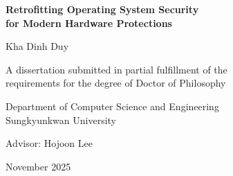 \documentclass[a4paper,11pt]{report}
\begin{document}



\begin{titlepage}
\centering
\vspace*{3cm}
{\LARGE\bfseries Retrofitting Operating System Security\\[0.3em] for Modern Hardware Protections\par}
\vspace{2cm}
{\Large Kha Dinh Duy\par}
\vspace{2cm}
{\large A dissertation submitted in partial fulfillment of the\\
requirements for the degree of Doctor of Philosophy\par}
\vspace{1cm}
{\large Department of Computer Science and Engineering\\
Sungkyunkwan University\par}
\vspace{1cm}
{\large Advisor: Hojoon Lee\par}
\vfill
{\large November 2025\par}
\end{titlepage}



%

 \label{chap:Acknowledgement}
% 

\newpage

\setcounter{tocdepth}{2}
\tableofcontents


\newpage
{} \label{listoftab}
\listoftables

\newpage
{} \label{listoffig}
\listoffigures
\end{document}
